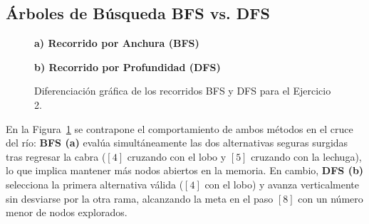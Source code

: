 \documentclass[11pt,letterpaper]{article}
\begin{document}
\subsection{Árboles de Búsqueda BFS vs. DFS}

\begin{figure}[H]
\centering
\begin{minipage}[t]{0.48\linewidth}
\centering
\textbf{\scriptsize a) Recorrido por Anchura (BFS)}\\[4pt]
\end{minipage}
\hfill
\begin{minipage}[t]{0.48\linewidth}
\centering
\textbf{\scriptsize b) Recorrido por Profundidad (DFS)}\\[4pt]
\end{minipage}
\caption{Diferenciación gráfica de los recorridos BFS y DFS para el Ejercicio 2.}
\label{fig:pastor_bfs_dfs}
\end{figure}

En la Figura~\ref{fig:pastor_bfs_dfs} se contrapone el comportamiento de ambos métodos en el cruce del río: \textbf{BFS (a)} evalúa simultáneamente las dos alternativas seguras surgidas tras regresar la cabra ($[4]$ cruzando con el lobo y $[5]$ cruzando con la lechuga), lo que implica mantener más nodos abiertos en la memoria. En cambio, \textbf{DFS (b)} selecciona la primera alternativa válida ($[4]$ con el lobo) y avanza verticalmente sin desviarse por la otra rama, alcanzando la meta en el paso $[8]$ con un número menor de nodos explorados.
\end{document}
